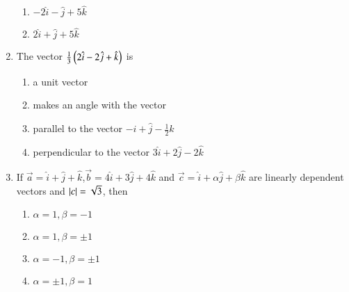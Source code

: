 \documentclass[journal,12pt,twocolumn]{IEEEtran}
\theoremstyle{remark}
\begin{document}
\begin{enumerate}
\begin{enumerate}
			\item $-2\hat{i}-\hat{j}+5\hat{k}$
			\item $2\hat{i}+\hat{j}+5\hat{k}$
		\end{enumerate}
\item %
	The vector $\frac{1}{3}\left(2\hat{i}-2\hat{j}+\hat{k}\right)$ is \hfill{}\\
		\begin{enumerate}
			\item a unit vector
			\item makes an angle with the vector
			\item parallel to the vector $-\hat{i}+\hat{j}-\frac{1}{2}\hat{k}$
			\item perpendicular to the vector $3\hat{i}+2\hat{j}-2\hat{k}$
                \end{enumerate}
\item %
	If $\vec{a}=\hat{i}+\hat{j}+\hat{k}$,$\vec{b}=4\hat{i}+3\hat{j}+4\hat{k}$ and $\vec{c}=\hat{i}+\alpha\hat{j}+\beta\hat{k}$ are linearly dependent vectors and $\left\vert c\right\vert=\sqrt{3}$, then \hfill{}\\
		\begin{enumerate}
			\item $\alpha=1,\beta=-1$
			\item $\alpha=1,\beta=\pm1$
			\item $\alpha=-1,\beta=\pm1$
			\item $\alpha=\pm1,\beta=1$
		\end{enumerate}
\end{enumerate}
\end{document}
